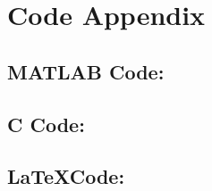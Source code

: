 \documentclass{article}
\begin{document}
\section{Code Appendix}
    \subsection{MATLAB Code:}
             
    \newpage
    \subsection{C Code:}
        
    \newpage
    \subsection{\LaTeX Code:}
        
\end{document}
